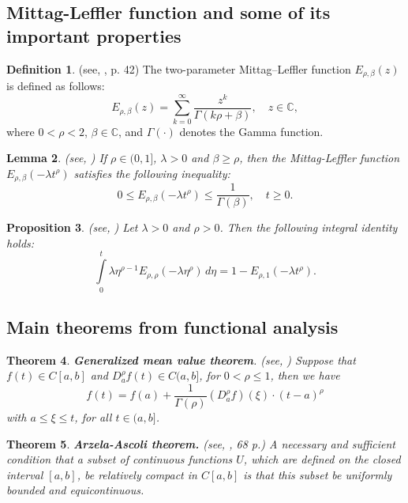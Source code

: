 \documentclass[reqno]{amsart}
\newtheorem{thm}{Theorem}[section]
\newtheorem{lem}[thm]{Lemma}
\newtheorem{prop}[thm]{Proposition}
\theoremstyle{definition}
\newtheorem{defn}[thm]{Definition}
\numberwithin{equation}{section}
\begin{document}
\subsection{Mittag-Leffler function and some of its important properties} 

\begin{defn}\label{def2.1} (see, \cite{Dzhrbashyan}, p. 42) The two-parameter Mittag–Leffler function $E_{\rho ,\beta } (z)$ is defined as follows:
$$E_{\rho ,\beta } (z) = \sum _{k=0}^{\infty }\frac{z^{k}}{\Gamma \left(k\rho +\beta \right)}, \quad z \in {\mathbb C},$$
where $0 < \rho < 2$, $\beta \in \mathbb{C}$, and $\Gamma(\cdot)$ denotes the Gamma function.
\end{defn}

\begin{lem}\label{lem2.2} (see, \cite{SerikbaevRuzhanskyTokmagambetov}) 
If $\rho \in (0,1]$, $\lambda>0$ and $\beta \ge \rho$, then the Mittag-Leffler function $E_{\rho ,\beta}(-\lambda t^{\rho})$ satisfies the following inequality:
$$
0 \le E_{\rho ,\beta}(-\lambda t^{\rho}) \le \frac{1}{\Gamma(\beta)}, \quad t \ge 0.
$$
\end{lem}

\begin{prop}\label{prop2.3} (see, \cite{AshurovYusuf21})
Let $\lambda > 0$ and $\rho > 0$. Then the following integral identity holds:
$$
\int\limits_{0}^{t} \lambda \eta^{\rho-1} E_{\rho,\rho}(-\lambda \eta^{\rho}) \, d\eta = 1 - E_{\rho,1}(-\lambda t^{\rho}).
$$
\end{prop}

\subsection{Main theorems from functional analysis} 

\begin{thm} \label{thm2.4} \textbf{Generalized mean value theorem}. (see, \cite{Odibat}) Suppose that $f(t) \in C[a, b]$ and $D_a^\rho f(t) \in C(a, b]$, for $0<\rho \le 1$, then we have
$$
f(t)=f(a)+\frac{1}{\Gamma(\rho)}\left(D_a^\rho f\right)(\xi) \cdot(t-a)^\rho
$$
with $a \leqslant \xi \leqslant t$, for all $t \in(a, b]$.
\end{thm}

\begin{thm} \label{thm2.5} \textbf{Arzela-Ascoli theorem.} (see, \cite{KilbasSrivstavaTrujillo}, 68 p.) A necessary and sufficient condition that a subset of continuous functions $U$, which are defined on the closed interval $[a, b]$, be relatively compact in $C[a, b]$ is that this subset be uniformly bounded and equicontinuous.
\end{thm}
\end{document}
